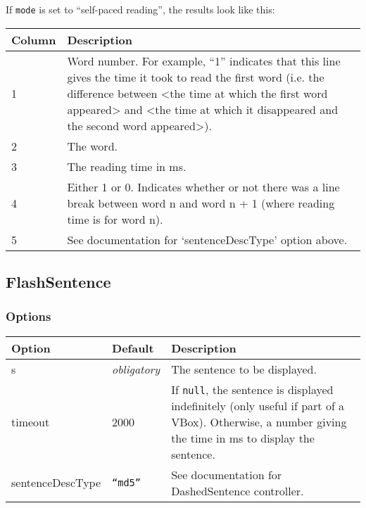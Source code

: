 \documentclass[11pt,letterpaper]{article}
\begin{document}
\normalsize

If \texttt{mode} is set to ``self-paced reading'', the results look like this:



\footnotesize
\begin{RaggedRight}
\sloppy
\begin{tabular}{|p{1.0504in}|p{4.4496in}|}
\hline
 \textbf{Column}  &  \textbf{Description} \\
\hline
 1         &  Word number. For example, ``1'' indicates that this line gives the time it took to read the first word (i.e. the difference between <the time at which the first word appeared> and <the time at which it disappeared and the second word appeared>). \\
\hline
 2         &  The word. \\
\hline
 3         &  The reading time in ms. \\
\hline
 4         &  Either 1 or 0. Indicates whether or not there was a line break between word n and word n + 1 (where reading time is for word n). \\
\hline
 5         &  See documentation for `sentenceDescType' option above. 
\\\hline
\end{tabular}
\end{RaggedRight}
\fussy

\normalsize

\subsection{FlashSentence}

\subsubsection*{Options}



\footnotesize
\begin{RaggedRight}
\sloppy
\begin{tabular}{|p{1.0726in}|p{1.0726in}|p{3.3548in}|}
\hline
 \textbf{Option}  &  \textbf{Default}     &  \textbf{Description}                 \\
\hline
 s         & \textit{ obligatory}   &  The sentence to be displayed. \\
\hline
 timeout   &  2000          &  If \texttt{null}, the sentence is displayed indefinitely (only useful if part of a VBox). Otherwise, a number giving the time in ms to display the sentence.    \\
\hline
 sentenceDescType  &  \texttt{``md5''}  &  See documentation for DashedSentence controller. 
\\\hline
\end{tabular}
\end{RaggedRight}
\fussy
\end{document}
